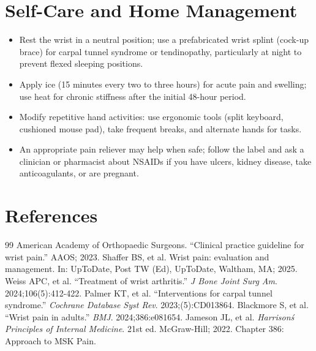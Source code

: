 \section*{Self-Care and Home Management}
\begin{itemize}
  \item Rest the wrist in a neutral position; use a prefabricated wrist splint (cock-up brace) for carpal tunnel syndrome or tendinopathy, particularly at night to prevent flexed sleeping positions.
  \item Apply ice (15 minutes every two to three hours) for acute pain and swelling; use heat for chronic stiffness after the initial 48-hour period.
  \item Modify repetitive hand activities: use ergonomic tools (split keyboard, cushioned mouse pad), take frequent breaks, and alternate hands for tasks.
  \item An appropriate pain reliever may help when safe; follow the label and ask a clinician or pharmacist about NSAIDs if you have ulcers, kidney disease, take anticoagulants, or are pregnant.
\end{itemize}

\section*{References}
\begin{thebibliography}{99}
 American Academy of Orthopaedic Surgeons. ``Clinical practice guideline for wrist pain.'' AAOS; 2023.
 Shaffer BS, et al. Wrist pain: evaluation and management. In: UpToDate, Post TW (Ed), UpToDate, Waltham, MA; 2025.
 Weiss APC, et al. ``Treatment of wrist arthritis.'' \emph{J Bone Joint Surg Am}. 2024;106(5):412-422.
 Palmer KT, et al. ``Interventions for carpal tunnel syndrome.'' \emph{Cochrane Database Syst Rev}. 2023;(5):CD013864.
 Blackmore S, et al. ``Wrist pain in adults.'' \emph{BMJ}. 2024;386:e081654.
 Jameson JL, et al. \emph{Harrison\'s Principles of Internal Medicine}. 21st ed. McGraw-Hill; 2022. Chapter 386: Approach to MSK Pain.
\end{thebibliography}
